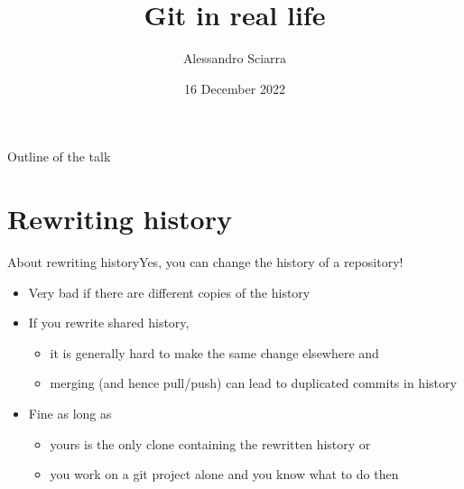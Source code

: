 \documentclass[usenames,svgnames,14pt]{beamer}
\title{Git in real life}
\date{16 December 2022}
\author{Alessandro Sciarra}
\institute{Z02~--~Software Development Center}
\begin{document}
\begin{frame}
    \titlepage
\end{frame}
\begin{frame}{Outline of the talk}
    \tableofcontents[subsectionstyle=hide]
\end{frame}


\section{Rewriting history}
\begin{frame}{About rewriting history}{Yes, you can change the history of a repository!}
\begin{overlayarea}{\textwidth}{0.3\textheight}
    \setlength{\leftmargini}{5mm}
    \begin{itemize}
        \item\alert{Very bad if there are different copies of the history} 
        \item If you rewrite shared history,\\
              \begin{itemize}
                  \item it is generally hard to make the same change elsewhere and\\
                  \item merging (and hence pull/push) can lead to duplicated commits in history
              \end{itemize}
        \item<only@1> Fine as long as\\
              \begin{itemize}
                  \item yours is the only clone containing the rewritten history or
                  \item you work on a git project alone and you know what to do then
              \end{itemize}
    \end{itemize}
\end{overlayarea}
    \begin{center}
        \begin{tikzpicture}[scope on=<2->]

\end{tikzpicture}
\end{center}
\end{frame}
\end{document}
